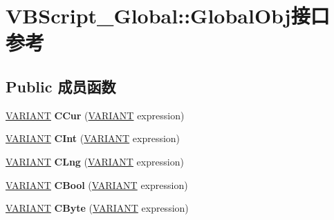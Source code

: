 \hypertarget{interface_v_b_script___global_1_1_global_obj}{}\section{V\+B\+Script\+\_\+\+Global\+:\+:Global\+Obj接口 参考}
\label{interface_v_b_script___global_1_1_global_obj}
\subsection*{Public 成员函数}
\begin{DoxyCompactItemize}
\item 
\mbox{\label{interface_v_b_script___global_1_1_global_obj_a3984633d625b1d696ffef2a712471bbe}} 
\hyperlink{structtag_v_a_r_i_a_n_t}{V\+A\+R\+I\+A\+NT} {\bfseries C\+Cur} (\hyperlink{structtag_v_a_r_i_a_n_t}{V\+A\+R\+I\+A\+NT} expression)
\item 
\mbox{\label{interface_v_b_script___global_1_1_global_obj_a8fc6281bfffd8b50e9ad3c571310119c}} 
\hyperlink{structtag_v_a_r_i_a_n_t}{V\+A\+R\+I\+A\+NT} {\bfseries C\+Int} (\hyperlink{structtag_v_a_r_i_a_n_t}{V\+A\+R\+I\+A\+NT} expression)
\item 
\mbox{\label{interface_v_b_script___global_1_1_global_obj_a3df0df7aead206e7209ac13a138b6ac0}} 
\hyperlink{structtag_v_a_r_i_a_n_t}{V\+A\+R\+I\+A\+NT} {\bfseries C\+Lng} (\hyperlink{structtag_v_a_r_i_a_n_t}{V\+A\+R\+I\+A\+NT} expression)
\item 
\mbox{\label{interface_v_b_script___global_1_1_global_obj_a510b5523cde4966ef48fbd82303f1876}} 
\hyperlink{structtag_v_a_r_i_a_n_t}{V\+A\+R\+I\+A\+NT} {\bfseries C\+Bool} (\hyperlink{structtag_v_a_r_i_a_n_t}{V\+A\+R\+I\+A\+NT} expression)
\item 
\mbox{\label{interface_v_b_script___global_1_1_global_obj_a152b4f11b96402b9e5dce8352dccb00a}} 
\hyperlink{structtag_v_a_r_i_a_n_t}{V\+A\+R\+I\+A\+NT} {\bfseries C\+Byte} (\hyperlink{structtag_v_a_r_i_a_n_t}{V\+A\+R\+I\+A\+NT} expression)
\item 

\end{DoxyCompactItemize}
